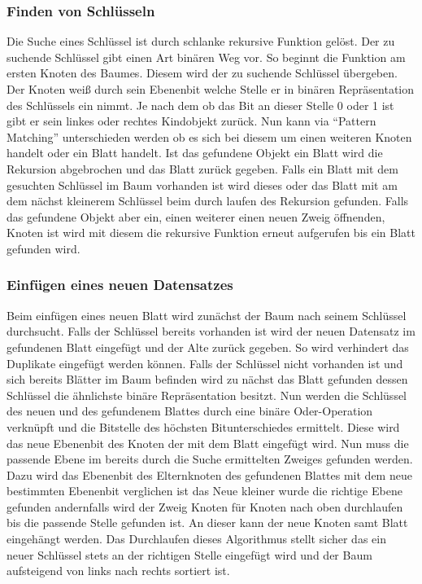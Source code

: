 \documentclass[a4paper,11pt,oneside,%
headsepline,												%
footsepline,												%
bibtotocnumbered									%
]{scrreprt}
\begin{document}
\subsubsection{Finden von Schlüsseln}
Die Suche eines Schlüssel ist durch schlanke rekursive Funktion gelöst. Der zu suchende Schlüssel gibt einen Art binären Weg vor. So beginnt die Funktion am ersten Knoten des Baumes. Diesem wird der zu suchende Schlüssel übergeben. Der Knoten weiß durch sein Ebenenbit welche Stelle er in binären Repräsentation des Schlüssels ein nimmt. Je nach dem ob das Bit an dieser Stelle 0 oder 1 ist gibt er sein linkes oder rechtes Kindobjekt zurück. Nun kann via \enquote{Pattern Matching} unterschieden werden ob es sich bei diesem um einen weiteren Knoten handelt oder ein Blatt handelt. Ist das gefundene Objekt ein Blatt wird die Rekursion abgebrochen und das Blatt zurück gegeben. Falls ein Blatt mit dem gesuchten Schlüssel im Baum vorhanden ist wird dieses oder das Blatt mit am dem nächst kleinerem Schlüssel beim durch laufen des Rekursion gefunden. Falls das gefundene Objekt aber ein, einen weiterer einen neuen Zweig öffnenden, Knoten ist wird mit diesem die rekursive Funktion erneut aufgerufen bis ein Blatt gefunden wird.
\subsubsection{Einfügen eines neuen Datensatzes}
Beim einfügen eines neuen Blatt wird zunächst der Baum nach seinem Schlüssel durchsucht. Falls der Schlüssel bereits vorhanden ist wird der neuen Datensatz im gefundenen Blatt eingefügt und der Alte zurück gegeben. So wird verhindert das Duplikate eingefügt werden können. Falls der Schlüssel nicht vorhanden ist und sich bereits Blätter im Baum befinden wird zu nächst das Blatt gefunden dessen Schlüssel die ähnlichste binäre Repräsentation besitzt. Nun werden die Schlüssel des neuen und des gefundenem Blattes durch eine binäre Oder-Operation verknüpft und  die Bitstelle des höchsten Bitunterschiedes ermittelt. Diese wird das neue Ebenenbit des Knoten der mit dem Blatt eingefügt wird. Nun muss die passende Ebene im bereits durch die Suche ermittelten Zweiges gefunden werden. Dazu wird das Ebenenbit des Elternknoten des gefundenen Blattes mit dem neue bestimmten Ebenenbit verglichen ist das Neue kleiner wurde die richtige Ebene gefunden andernfalls wird der Zweig Knoten für Knoten nach oben durchlaufen bis die passende Stelle gefunden ist. An dieser kann der neue Knoten samt Blatt eingehängt werden. Das Durchlaufen dieses Algorithmus stellt sicher das ein neuer Schlüssel stets an der richtigen Stelle eingefügt wird und der Baum aufsteigend von links nach rechts sortiert ist.
\end{document}

